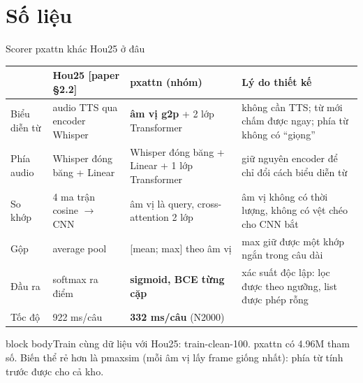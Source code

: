 \documentclass[aspectratio=169,xcolor=table]{beamer}
\newcommand{\hi}[1]{\textcolor{Primary}{\textbf{#1}}}
\newcommand{\good}[1]{\textcolor{GoodGreen}{\textbf{#1}}}
\newcommand{\src}[1]{{\tiny\color{TextGray}[#1]}}
\newcommand{\ra}{$\rightarrow$}
\newcommand{\nbox}[2][block body]{\begin{beamercolorbox}[sep=0.45em,rounded=true]{#1}\footnotesize #2\end{beamercolorbox}}
\begin{document}
\section{Số liệu}
\begin{frame}{Scorer pxattn khác Hou25 ở đâu}
\centering\scriptsize\setlength{\tabcolsep}{4pt}
\begin{tabular}{L{1.8cm}L{3.5cm}L{3.5cm}L{5.1cm}}
\toprule
 & Hou25 \src{paper §2.2} & pxattn (nhóm) & Lý do thiết kế \\
\midrule
Biểu diễn từ & audio TTS qua encoder Whisper & \hi{âm vị g2p} + 2 lớp Transformer & không cần TTS; từ mới chấm được ngay; phía từ không có ``giọng'' \\
Phía audio & Whisper đóng băng + Linear & Whisper đóng băng + Linear + 1 lớp Transformer & giữ nguyên encoder để chỉ đổi cách biểu diễn từ \\
So khớp & 4 ma trận cosine \ra{} CNN & âm vị là query, cross-attention 2 lớp & âm vị không có thời lượng, không có vệt chéo cho CNN bắt \\
Gộp & average pool & [mean; max] theo âm vị & max giữ được một khớp ngắn trong câu dài \\
Đầu ra & softmax ra điểm & \hi{sigmoid, BCE từng cặp} & xác suất độc lập: lọc được theo ngưỡng, list được phép rỗng \\
Tốc độ & 922 ms/câu & \good{332 ms/câu} (N2000) & \\
\bottomrule
\end{tabular}\par
\vspace{0.25cm}\raggedright
\nbox{Train cùng dữ liệu với Hou25: train-clean-100. pxattn có 4.96M tham số. Biến thể rẻ hơn là pmaxsim (mỗi âm vị lấy frame giống nhất): phía từ tính trước được cho cả kho.}
\end{frame}
\end{document}
